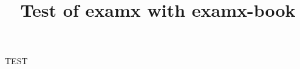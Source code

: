 \documentclass{examx}
\title{Test of examx with examx-book}
\begin{document}
    TEST
\end{document}
